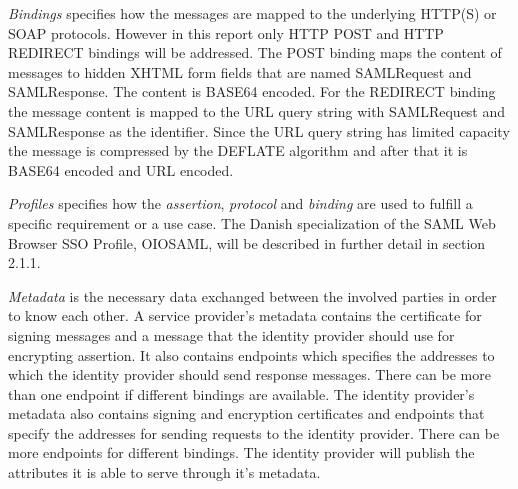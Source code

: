 \documentclass[twosided]{report}
\begin{document}
\par
\emph{Bindings} specifies how the messages are mapped to the underlying HTTP(S) or SOAP protocols. However in this report only HTTP POST and HTTP REDIRECT bindings will be addressed. The POST binding maps the content of messages to hidden XHTML form fields that are named SAMLRequest and SAMLResponse. The content is BASE64 encoded. For the REDIRECT binding the message content is mapped to the URL query string with SAMLRequest and SAMLResponse as the identifier. Since the URL query string has limited capacity the message is compressed by the DEFLATE algorithm and after that it is BASE64 encoded and URL encoded.
\par
\emph{Profiles} specifies how the \emph{assertion}, \emph{protocol} and \emph{binding} are used to fulfill a specific requirement or a use case. The Danish specialization of the SAML Web Browser SSO Profile, OIOSAML, will be described in further detail in section 2.1.1.
\par
\emph{Metadata} is the necessary data exchanged between the involved parties in order to know each other. A service provider's metadata contains the certificate for signing messages and a message that the identity provider should use for encrypting assertion. It also contains endpoints which specifies the addresses to which the identity provider should send response messages. There can be more than one endpoint if different bindings are available. The identity provider's metadata also contains signing and encryption certificates and endpoints that specify the addresses for sending requests to the identity provider. There can be more endpoints for different bindings. The identity provider will publish the attributes it is able to serve through it's metadata.
\end{document}
